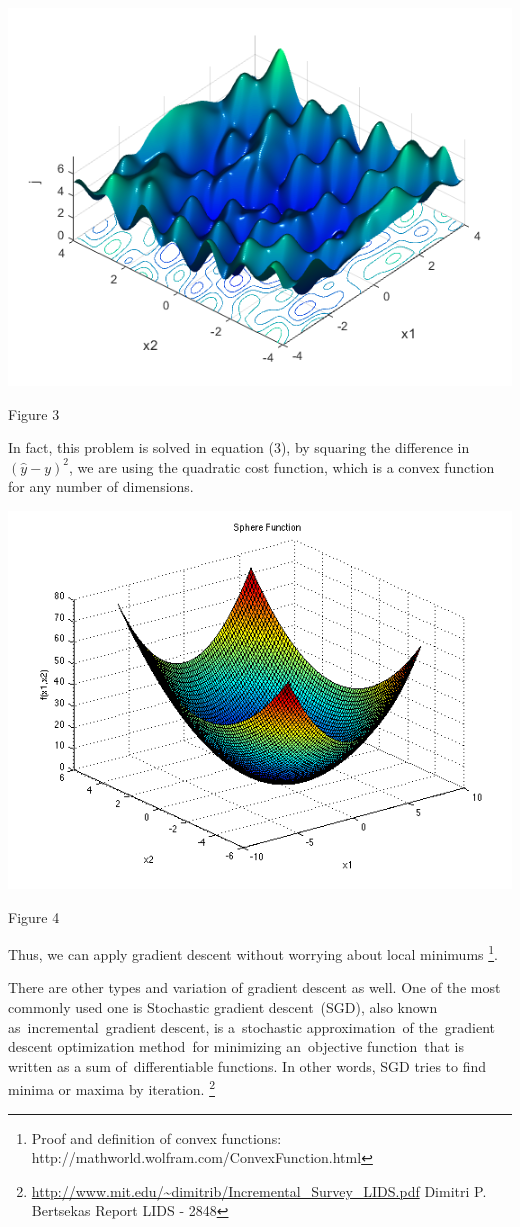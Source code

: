 \documentclass[]{article}
\begin{document}
\begin{multicols}{2}
\centerline{\includegraphics[width=0.9\linewidth]{non-convex} }
\centerline{Figure 3}
\vspace{0.5cm}

In fact, this problem is solved in equation (3), by squaring
the difference in \({(\hat{y} - y)}^{2}\), we are using the quadratic cost function, which is a convex function for any number of dimensions. 

\centerline{\includegraphics[width=0.9\linewidth]{convex} }
\centerline{Figure 4}
\vspace{0.5cm}

Thus, we can apply gradient descent without worrying about local minimums \footnote{Proof and definition of convex functions:
	http://mathworld.wolfram.com/ConvexFunction.html}. 

There are other types and variation of gradient descent as well. One of
the most commonly used one is Stochastic gradient descent~(SGD), also
known as~incremental~gradient descent, is a~stochastic approximation~of
the~gradient descent optimization method~for minimizing an~objective
function~that is written as a sum of~differentiable functions. In other
words, SGD tries to find minima or maxima by iteration. \footnote{\url{http://www.mit.edu/~dimitrib/Incremental_Survey_LIDS.pdf}
  Dimitri P. Bertsekas Report LIDS - 2848}


\end{multicols}
\end{document}
